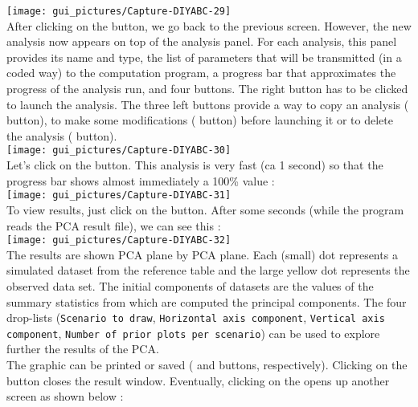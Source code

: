 \texttt{[image: gui\_pictures/Capture-DIYABC-29]}\\


After clicking on the  button, we go back
to the previous screen. However, the new analysis now appears on top
of the analysis panel. For each analysis, this panel provides its
name and type, the list of parameters that will be transmitted (in
a coded way) to the computation program, a progress bar that approximates
the progress of the analysis run, and four buttons. The right button
has to be clicked to launch the analysis. The three left buttons provide
a way to copy an analysis ( button), to make
some modifications ( button) before launching
it or to delete the analysis ( button).\\


\texttt{[image: gui\_pictures/Capture-DIYABC-30]} \\


Let's click on the  button. This analysis
is very fast (ca 1 second) so that the progress bar shows almost immediately
a 100\% value : \\


\texttt{[image: gui\_pictures/Capture-DIYABC-31]} \\


To view results, just click on the 
button. After some seconds (while the program reads the PCA result
file), we can see this : \\


\texttt{[image: gui\_pictures/Capture-DIYABC-32]} \\


The results are shown PCA plane by PCA plane. Each (small) dot represents
a simulated dataset from the reference table and the large yellow
dot represents the observed data set. The initial components of datasets
are the values of the summary statistics from which are computed the
principal components. The four drop-lists (\texttt{Scenario to draw},
\texttt{Horizontal axis component}, \texttt{Vertical axis component},
\texttt{Number of prior plots per scenario}) can be used to explore
further the results of the PCA.\\
 The graphic can be printed or saved ( and
 buttons, respectively). Clicking on the 
button closes the result window. Eventually, clicking on the  opens up another screen as shown below :\\



